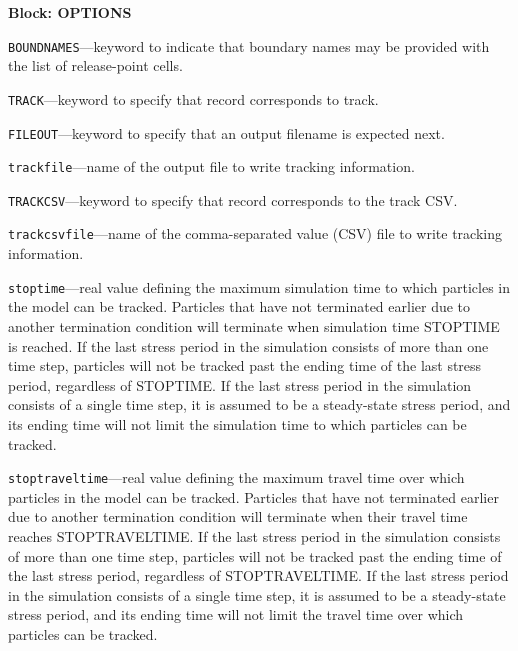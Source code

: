 
\item \textbf{Block: OPTIONS}

\begin{description}
\item \texttt{BOUNDNAMES}---keyword to indicate that boundary names may be provided with the list of release-point cells.

\item \texttt{TRACK}---keyword to specify that record corresponds to track.

\item \texttt{FILEOUT}---keyword to specify that an output filename is expected next.

\item \texttt{trackfile}---name of the output file to write tracking information.

\item \texttt{TRACKCSV}---keyword to specify that record corresponds to the track CSV.

\item \texttt{trackcsvfile}---name of the comma-separated value (CSV) file to write tracking information.

\item \texttt{stoptime}---real value defining the maximum simulation time to which particles in the model can be tracked.  Particles that have not terminated earlier due to another termination condition will terminate when simulation time STOPTIME is reached.  If the last stress period in the simulation consists of more than one time step, particles will not be tracked past the ending time of the last stress period, regardless of STOPTIME.  If the last stress period in the simulation consists of a single time step, it is assumed to be a steady-state stress period, and its ending time will not limit the simulation time to which particles can be tracked.

\item \texttt{stoptraveltime}---real value defining the maximum travel time over which particles in the model can be tracked.  Particles that have not terminated earlier due to another termination condition will terminate when their travel time reaches STOPTRAVELTIME.  If the last stress period in the simulation consists of more than one time step, particles will not be tracked past the ending time of the last stress period, regardless of STOPTRAVELTIME.  If the last stress period in the simulation consists of a single time step, it is assumed to be a steady-state stress period, and its ending time will not limit the travel time over which particles can be tracked.


\end{description}
